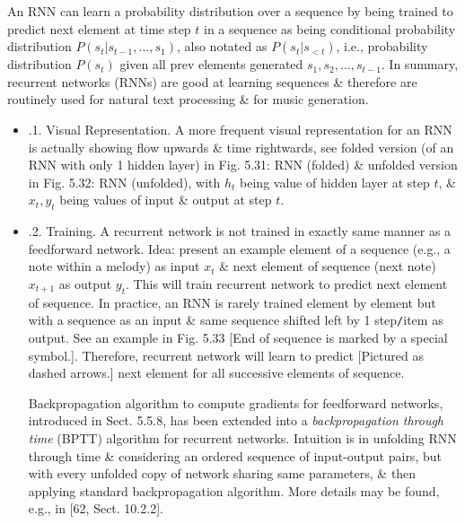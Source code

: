 \documentclass{article}
\begin{document}
\begin{itemize}
\begin{itemize}
		An RNN can learn a probability distribution over a sequence by being trained to predict next element at time step $t$ in a sequence as being conditional probability distribution $P(s_t|s_{t-1},\ldots,s_1)$, also notated as $P(s_t|s_{< t})$, i.e., probability distribution $P(s_t)$ given all prev elements generated $s_1,s_2,\ldots,s_{t-1}$. In summary, recurrent networks (RNNs) are good at learning sequences \& therefore are routinely used for natural text processing \& for music generation.
		\begin{itemize}
			\item {.1. Visual Representation.} A more frequent visual representation for an RNN is actually showing flow upwards \& time rightwards, see folded version (of an RNN with only 1 hidden layer) in {\sf Fig. 5.31: RNN (folded)} \& unfolded version in {\sf Fig. 5.32: RNN (unfolded)}, with $h_t$ being value of hidden layer at step $t$, \& $x_t,y_t$ being values of input \& output at step $t$.
			\item {.2. Training.} A recurrent network is not trained in exactly same manner as a feedforward network. Idea: present an example element of a sequence (e.g., a note within a melody) as input $x_t$ \& next element of sequence (next note) $x_{t+1}$ as output $y_t$. This will train recurrent network to predict next element of sequence. In practice, an RNN is rarely trained element by element but with a sequence as an input \& same sequence shifted left by 1 step{\tt/}item as output. See an example in {\sf Fig. 5.33} [End of sequence is marked by a special symbol.]. Therefore, recurrent network will learn to predict [Pictured as dashed arrows.] next element for all successive elements of sequence.

			Backpropagation algorithm to compute gradients for feedforward networks, introduced in Sect. 5.5.8, has been extended into a {\it backpropagation through time} (BPTT) algorithm for recurrent networks. Intuition is in unfolding RNN through time \& considering an ordered sequence of input-output pairs, but with every unfolded copy of network sharing same parameters, \& then applying standard backpropagation algorithm. More details may be found, e.g., in [62, Sect. 10.2.2].


\end{itemize}
\end{itemize}
\end{itemize}
\end{document}
